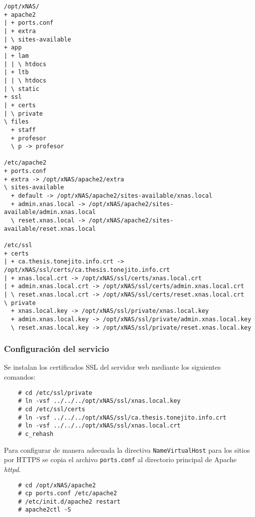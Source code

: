 {
\scriptsize
\linespread{1}
\begin{verbatim}
/opt/xNAS/
+ apache2
| + ports.conf
| + extra
| \ sites-available
+ app
| + lam
| | \ htdocs
| + ltb
| | \ htdocs
| \ static
+ ssl
| + certs
| \ private
\ files
  + staff
  + profesor
  \ p -> profesor

/etc/apache2
+ ports.conf
+ extra -> /opt/xNAS/apache2/extra
\ sites-available
  + default -> /opt/xNAS/apache2/sites-available/xnas.local
  + admin.xnas.local -> /opt/xNAS/apache2/sites-available/admin.xnas.local
  \ reset.xnas.local -> /opt/xNAS/apache2/sites-available/reset.xnas.local

/etc/ssl
+ certs
| + ca.thesis.tonejito.info.crt -> /opt/xNAS/ssl/certs/ca.thesis.tonejito.info.crt
| + xnas.local.crt -> /opt/xNAS/ssl/certs/xnas.local.crt
| + admin.xnas.local.crt -> /opt/xNAS/ssl/certs/admin.xnas.local.crt
| \ reset.xnas.local.crt -> /opt/xNAS/ssl/certs/reset.xnas.local.crt
\ private
  + xnas.local.key -> /opt/xNAS/ssl/private/xnas.local.key
  + admin.xnas.local.key -> /opt/xNAS/ssl/private/admin.xnas.local.key
  \ reset.xnas.local.key -> /opt/xNAS/ssl/private/reset.xnas.local.key
\end{verbatim}
}

        \subsubsection {Configuraci\'{o}n del servicio}

Se instalan los certificados \textsc{SSL} del servidor web mediante los siguientes comandos:

{
\scriptsize
\linespread{1}
\begin{verbatim}
    # cd /etc/ssl/private
    # ln -vsf ../../../opt/xNAS/ssl/xnas.local.key
    # cd /etc/ssl/certs
    # ln -vsf ../../../opt/xNAS/ssl/ca.thesis.tonejito.info.crt
    # ln -vsf ../../../opt/xNAS/ssl/xnas.local.crt
    # c_rehash
\end{verbatim}
}

Para configurar de manera adecuada la directiva \texttt{NameVirtualHost} para los sitios por \textsc{HTTPS} se copia el archivo \texttt{ports.conf} al directorio principal de Apache \textit{httpd}.

{
\scriptsize
\linespread{1}
\begin{verbatim}
    # cd /opt/xNAS/apache2
    # cp ports.conf /etc/apache2
    # /etc/init.d/apache2 restart
    # apache2ctl -S
\end{verbatim}
}

